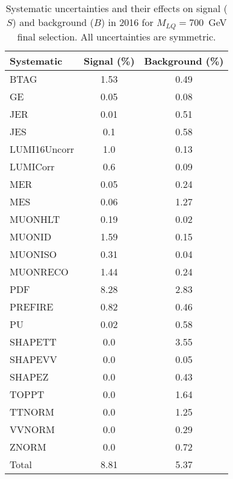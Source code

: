 \begin{table}[htbp]
\begin{center}
\caption{Systematic uncertainties and their effects on signal ($S$) and background ($B$) in 2016 for $M_{LQ}=700$~GeV final selection. All uncertainties are symmetric.}
\begin{tabular}{lcc}
\hline\hline
Systematic & Signal (\%) & Background (\%) \\ \hline 
BTAG & 1.53 & 0.49\\ 
GE & 0.05 & 0.08\\ 
JER & 0.01 & 0.51\\ 
JES & 0.1 & 0.58\\ 
LUMI16Uncorr & 1.0 & 0.13\\ 
LUMICorr & 0.6 & 0.09\\ 
MER & 0.05 & 0.24\\ 
MES & 0.06 & 1.27\\ 
MUONHLT & 0.19 & 0.02\\ 
MUONID & 1.59 & 0.15\\ 
MUONISO & 0.31 & 0.04\\ 
MUONRECO & 1.44 & 0.24\\ 
PDF & 8.28 & 2.83\\ 
PREFIRE & 0.82 & 0.46\\ 
PU & 0.02 & 0.58\\ 
SHAPETT & 0.0 & 3.55\\ 
SHAPEVV & 0.0 & 0.05\\ 
SHAPEZ & 0.0 & 0.43\\ 
TOPPT & 0.0 & 1.64\\ 
TTNORM & 0.0 & 1.25\\ 
VVNORM & 0.0 & 0.29\\ 
ZNORM & 0.0 & 0.72\\ 
Total & 8.81 & 5.37\\ \hline \hline
\end{tabular}
\label{tab:SysUncertainties_uujj_700}
\end{center}
\end{table}

